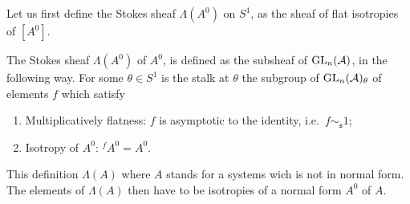 Let us first define the Stokes sheaf $\Lambda(A^0)$ on $S^1$, as the sheaf of
flat isotropies of $[A^0]$.
\begin{defn}\label{defn:StokesSheaf}
  \begin{comment}
    The Stokes sheaf $\Lambda(A^0)$ of $A^0$, is the sheaf of groups defined on
    $S^1$ whose stalk at any point $\theta\in S^1$ is the group of germs of
    $f\in\Gl_n(\cO(\mathfrak{s}))$, $\mathfrak{s}$ a sector containing
    $\theta$, satisfying the conditions:
    \begin{enumerate}
      \item Flatness:
        $\underset{x\in\mathfrak{s}}{\underset{x\to0}{\lim}}f(x)=1$ and
        $f\sim_{\mathfrak{s}} 1$;
        \PROBLEM[Why two condition?]
      \item Isotropy of $A^0$: ${}^f\!A^0=A^0$.
    \end{enumerate}
  \end{comment}
  The Stokes sheaf $\Lambda(A^0)$ of $A^0$, is defined as the subsheaf of
  $\operatorname{GL}_n(\mathcal{A})$, in the following way.
  For some $\theta\in S^1$ is the stalk at $\theta$ the subgroup of
  $\operatorname{GL}_n(\mathcal{A})_\theta$ of elements $f$ which satisfy
  \begin{enumerate}
    \item Multiplicatively flatness: $f$ is asymptotic to the identity,
      i.e.\ $f\sim_{\mathfrak{s}} 1$;
    \item Isotropy of $A^0$: ${}^f\!A^0=A^0$.
  \end{enumerate}
  \begin{s-rem}
    This definition  $\Lambda(A)$ where $A$ stands
    for a systems wich is not in normal form. The elements of $\Lambda(A)$ then
    have to be isotropies of a normal form $A^0$ of $A$.
  \end{s-rem}
  \begin{comment}
    \begin{s-lem}
      This is independent of the choice of the normal form.
    \end{s-lem}
  \end{comment}
  \iffalse
  \begin{comment}
    \begin{s-rem}
      \PROBLEM[remove? need more defs!]
      Sabbah \cite[110]{sabbah2007isomonodromic} talks about (global)
      meromorphic connections $\sM$ on a small disk $D$ around $0$ instead of
      germs of meromorphic connections.

      Define on $S^1$ the sheaf $\Aut^{<0}(\tilde\sM^{nf})$ of automorphisms of
      $\tilde\sM^{nf}:=\cA_D\otimes_{\cO_D}\sM^{nf}$ which
      \begin{itemize}
        \item are compatible with the connection and
        \item are formally equal to the identity, i.e.\ induce the identity on
          $\hat\sM^{nf}:=\hat\cO_D\otimes_{\cO_D}\sM^{nf}$
      \end{itemize}


\end{comment}
\end{defn}

